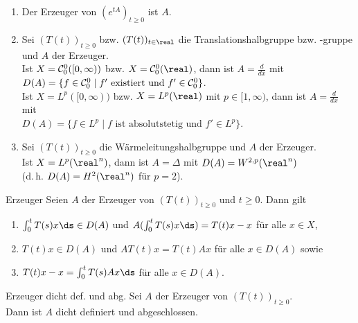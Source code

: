 \begin{Bsp}
    \begin{enumerate}[label=\emph{(\alph*)}]
        \item
        Der Erzeuger von $(e^{tA})_{t \ge 0}$ ist $A$.
        
        \item
        Sei $(T(t))_{t \ge 0}$ bzw. $(T(t))_{t \in \real}$ die Translationshalbgruppe bzw. -gruppe
        und $A$ der Erzeuger.\\
        Ist $X = \mathcal{C}^0_0([0, \infty))$ bzw. $X = \C^0_0(\real)$, dann ist
        $A = \frac{d}{dx}$ mit\\
        $D(A) = \{f \in \mathcal{C}^0_0 \;|\; \text{$f'$ existiert und $f' \in \mathcal{C}^0_0$}\}$.\\
        Ist $X = L^p([0, \infty))$ bzw. $X = L^p(\real)$ mit $p \in [1, \infty)$, dann ist
        $A = \frac{d}{dx}$ mit\\
        $D(A) = \{f \in L^p \;|\; \text{$f$ ist absolutstetig und $f' \in L^p$}\}$.
        
        \item
        Sei $(T(t))_{t \ge 0}$ die Wärmeleitungshalbgruppe und $A$ der Erzeuger.\\
        Ist $X = L^p(\real^n)$, dann ist $A = \Delta$ mit
        $D(A) = W^{2,p}(\real^n)$\\
        (d.\,h. $D(A) = H^2(\real^n)$ für $p = 2$).
    \end{enumerate}
\end{Bsp}

\linie

\begin{Lemma}{Erzeuger}
    Seien $A$ der Erzeuger von $(T(t))_{t \ge 0}$ und $t \ge 0$.
    Dann gilt
    \begin{enumerate}
        \item
        $\int_0^t T(s) x\ds \in D(A)$ und
        $A(\int_0^t T(s) x\ds) = T(t) x - x$ für alle $x \in X$,
        
        \item
        $T(t) x \in D(A)$ und $A T(t) x = T(t) A x$ für alle $x \in D(A)$ sowie
        
        \item
        $T(t) x - x = \int_0^t T(s) Ax\ds$ für alle $x \in D(A)$.
    \end{enumerate}
\end{Lemma}

\begin{Satz}{Erzeuger dicht def. und abg.}
    Sei $A$ der Erzeuger von $(T(t))_{t \ge 0}$.\\
    Dann ist $A$ dicht definiert und abgeschlossen.
\end{Satz}


